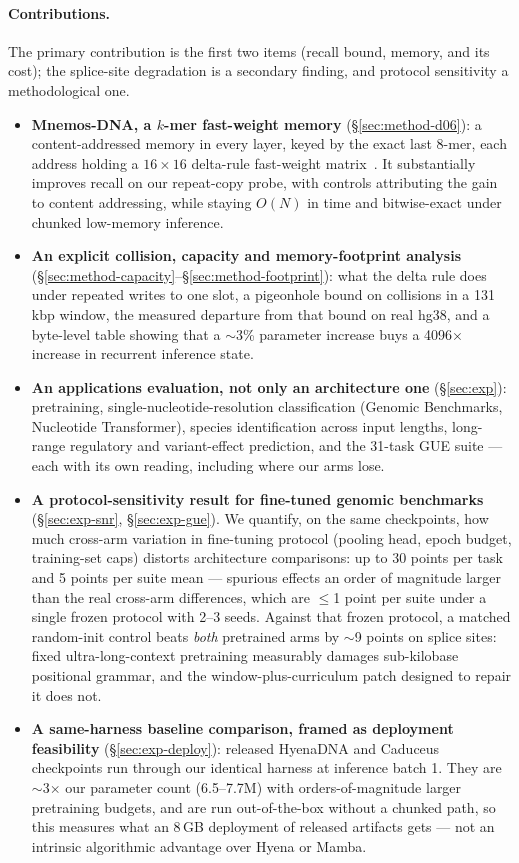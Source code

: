 \documentclass[11pt]{article}
\theoremstyle{plain}
\begin{document}
\paragraph{Contributions.} The primary contribution is the first two items (recall bound, memory,
and its cost); the splice-site degradation is a secondary finding, and protocol sensitivity a
methodological one.
\begin{itemize}
\item \textbf{Mnemos-DNA, a $k$-mer fast-weight memory} (\S\ref{sec:method-d06}): a content-addressed
memory in every layer, keyed by the exact last 8-mer, each address holding a $16\times16$
delta-rule fast-weight matrix~\cite{schlag2021linear}. It substantially improves recall on our
repeat-copy probe, with controls attributing the gain to content addressing, while staying $O(N)$ in time and bitwise-exact under chunked low-memory inference.
\item \textbf{An explicit collision, capacity and memory-footprint analysis}
(\S\ref{sec:method-capacity}--\S\ref{sec:method-footprint}): what the delta rule does under
repeated writes to one slot, a pigeonhole bound on collisions in a 131\,kbp window, the measured
departure from that bound on real hg38, and a byte-level table showing that a $\sim$3\% parameter
increase buys a 4096$\times$ increase in recurrent inference state.
\item \textbf{An applications evaluation, not only an architecture one} (\S\ref{sec:exp}):
pretraining, single-nucleotide-resolution classification (Genomic Benchmarks, Nucleotide
Transformer), species identification across input lengths, long-range regulatory and
variant-effect prediction, and the 31-task GUE suite --- each with its own reading, including
where our arms lose.
\item \textbf{A protocol-sensitivity result for fine-tuned genomic benchmarks}
(\S\ref{sec:exp-snr}, \S\ref{sec:exp-gue}). We quantify, on the same checkpoints, how much
cross-arm variation in fine-tuning protocol (pooling head, epoch budget, training-set caps)
distorts architecture comparisons: up to 30 points per task and 5 points per suite mean ---
spurious effects an order of magnitude larger than the real cross-arm differences, which are
$\le$1 point per suite under a single frozen protocol with 2--3 seeds. Against that frozen
protocol, a matched random-init control beats \emph{both} pretrained arms by $\sim$9 points on
splice sites: fixed ultra-long-context pretraining measurably damages sub-kilobase positional
grammar, and the window-plus-curriculum patch designed to repair it does not.
\item \textbf{A same-harness baseline comparison, framed as deployment feasibility}
(\S\ref{sec:exp-deploy}): released HyenaDNA and Caduceus checkpoints run through our identical
harness at inference batch 1. They are $\sim$3$\times$ our parameter count (6.5--7.7M) with
orders-of-magnitude larger pretraining budgets, and are run out-of-the-box without a chunked
path, so this measures what an 8\,GB deployment of released artifacts gets --- not an intrinsic
algorithmic advantage over Hyena or Mamba.
\end{itemize}
\end{document}
